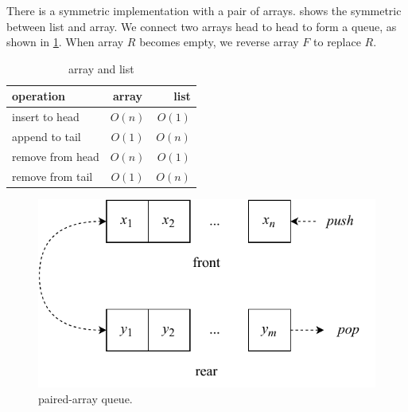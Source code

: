 \documentclass[b5paper]{article}
\begin{document}

There is a symmetric implementation with a pair of arrays.  shows the symmetric between list and array. We connect two arrays head to head to form a queue, as shown in \cref{fig:horseshoe-array}. When array $R$ becomes empty, we reverse array $F$ to replace $R$.

\begin{table}[htbp]
\centering
\begin{tabular}{l | c | r}
  \hline
  operation & array & list \\
  \hline
  insert to head & $O(n)$ & $O(1)$ \\
  append to tail & $O(1)$ & $O(n)$ \\
  remove from head & $O(n)$ & $O(1)$ \\
  remove from tail & $O(1)$ & $O(n)$ \\
  \hline
\end{tabular}
\caption{array and list}
\label{tab:array-list-comp}
\end{table}

\begin{figure}[htbp]
  \centering
  \includegraphics[scale=0.6]{img/paired-arrayq}
  \caption{paired-array queue.}
  \label{fig:horseshoe-array}
\end{figure}

\begin{Exercise}\label{ex:paired-list-queue}
\end{Exercise}
\end{document}
